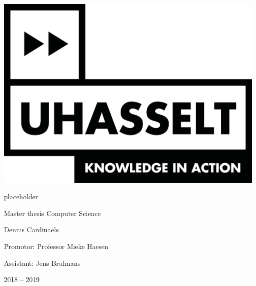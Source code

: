 
\begin{titlepage}
    \centering
    
    
    \includegraphics[scale=0.5]{chapters/title_page/logo_uhasselt}		
    \vspace{1cm}
    
    \Huge placeholder
    \vspace{0.4cm}
    
    \large Master thesis Computer Science
    \vspace{1cm}
    
    \LARGE Dennis Cardinaels
    \vspace{1cm}
    
    \large Promotor: Professor Mieke Haesen
    \vspace{0.2cm}
    
    Assistant: Jens Brulmans
    
    \vspace{1.2cm}
    
    
    \Large 2018 -- 2019 %
    
\end{titlepage}